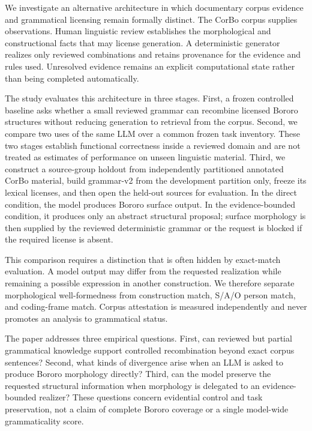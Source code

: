 \documentclass[11pt]{article}
\begin{document}
We investigate an alternative architecture in which documentary corpus evidence
and grammatical licensing remain formally distinct. The CorBo corpus supplies
observations. Human linguistic review establishes the morphological and
constructional facts that may license generation. A deterministic generator
realizes only reviewed combinations and retains provenance for the evidence and
rules used. Unresolved evidence remains an explicit computational state rather
than being completed automatically.

The study evaluates this architecture in three stages. First, a frozen controlled
baseline asks whether a small reviewed grammar can recombine licensed Bororo
structures without reducing generation to retrieval from the corpus. Second, we
compare two uses of the same LLM over a common frozen task inventory. These two
stages establish functional correctness inside a reviewed domain and are not
treated as estimates of performance on unseen linguistic material. Third, we
construct a source-group holdout from independently partitioned annotated
CorBo material, build grammar-v2 from the development partition only, freeze
its lexical licenses, and then open the held-out sources for evaluation. In the
direct condition, the model produces Bororo surface output. In the
evidence-bounded condition, it produces only an abstract structural proposal;
surface morphology is then supplied by the reviewed deterministic grammar or
the request is blocked if the required license is absent.

This comparison requires a distinction that is often hidden by exact-match
evaluation. A model output may differ from the requested realization while
remaining a possible expression in another construction. We therefore separate
morphological well-formedness from construction match, S/A/O person match, and
coding-frame match. Corpus attestation is measured independently and never
promotes an analysis to grammatical status.

The paper addresses three empirical questions. First, can reviewed but partial
grammatical knowledge support controlled recombination beyond exact corpus
sentences? Second, what kinds of divergence arise when an LLM is asked to
produce Bororo morphology directly? Third, can the model preserve the requested
structural information when morphology is delegated to an evidence-bounded
realizer? These questions concern evidential control and task preservation, not
a claim of complete Bororo coverage or a single model-wide grammaticality
score.
\end{document}
